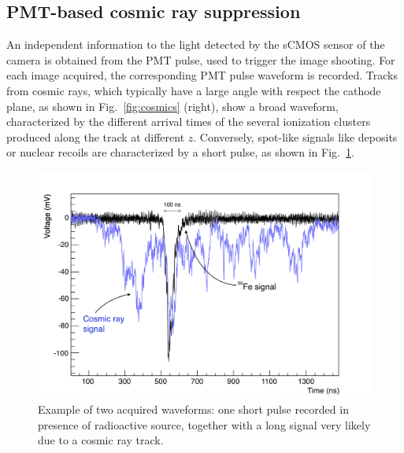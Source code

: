 \subsection{PMT-based cosmic ray suppression}
An independent information to the light detected by the sCMOS sensor
of the camera is obtained from the PMT pulse, used to trigger the
image shooting. For each image acquired, the corresponding PMT pulse
waveform is recorded.  Tracks from cosmic rays, which typically have a
large angle with respect the cathode plane, as shown in
Fig.~\ref{fig:cosmics} (right), show a broad waveform, characterized
by the different arrival times of the several ionization clusters
produced along the track at different $z$. Conversely, spot-like
signals like \fe deposits or nuclear recoils are characterized by a
short pulse, as shown in Fig.~\ref{fig:waveforms}.
%
\begin{figure}[ht]
  \begin{center}
    \includegraphics[width=0.69\linewidth]{figures/Waveforms.png}

    \caption{Example of two acquired waveforms: one short pulse
  recorded in presence of \fe radioactive source, together with a long
  signal very likely due to a cosmic ray
  track.  \label{fig:waveforms}}

  \end{center}
\end{figure}

